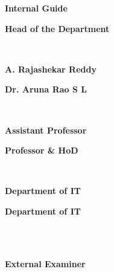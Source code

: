 \documentclass[12pt, English]{article}
\begin{document}
\begin{titlepage}
\noindent 
{\begin{normalsize}
{\textbf{Internal Guide}}
\end{normalsize}
}
\hfill 
{
\begin{normalsize}
\textbf{ Head of the Department}
\end{normalsize}
}\\
\noindent 
{\begin{normalsize}
{\textbf{A. Rajashekar Reddy}}
\end{normalsize}
}
\hfill 
{
\begin{normalsize}
\textbf{Dr. Aruna Rao S L}
\end{normalsize}
}\\
\noindent
{\begin{normalsize}
{\textbf{Assistant Professor}}
\end{normalsize}
}
\hspace{9.4cm}
{
\begin{normalsize}
\textbf{Professor \& HoD }
\end{normalsize}
}\\
\noindent 
{\begin{normalsize}
{\textbf{Department of IT}}
\end{normalsize}
}
\hspace{9.7cm} 
{
\begin{normalsize}
{\textbf{Department of IT}}
\end{normalsize}
}
\\
\\


\noindent 
{\begin{center}
{\textbf {External Examiner}}
\end{center}
}

\end{titlepage}
\end{document}
